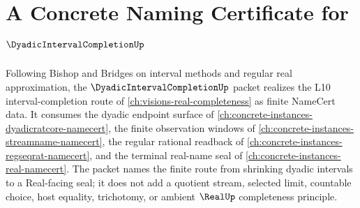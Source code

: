 \chapter{A Concrete Naming Certificate for $\DyadicIntervalCompletionUp$}
\label{ch:concrete-instances-dyadic-interval-completion-namecert}

Following Bishop and Bridges on interval methods and regular real approximation, the $\DyadicIntervalCompletionUp$ packet realizes the L10 interval-completion route of \autoref{ch:visions-real-completeness} as finite NameCert data. It consumes the dyadic endpoint surface of \autoref{ch:concrete-instances-dyadicratcore-namecert}, the finite observation windows of \autoref{ch:concrete-instances-streamname-namecert}, the regular rational readback of \autoref{ch:concrete-instances-regseqrat-namecert}, and the terminal real-name seal of \autoref{ch:concrete-instances-real-namecert}. The packet names the finite route from shrinking dyadic intervals to a Real-facing seal; it does not add a quotient stream, selected limit, countable choice, host equality, trichotomy, or ambient $\RealUp$ completeness principle.

